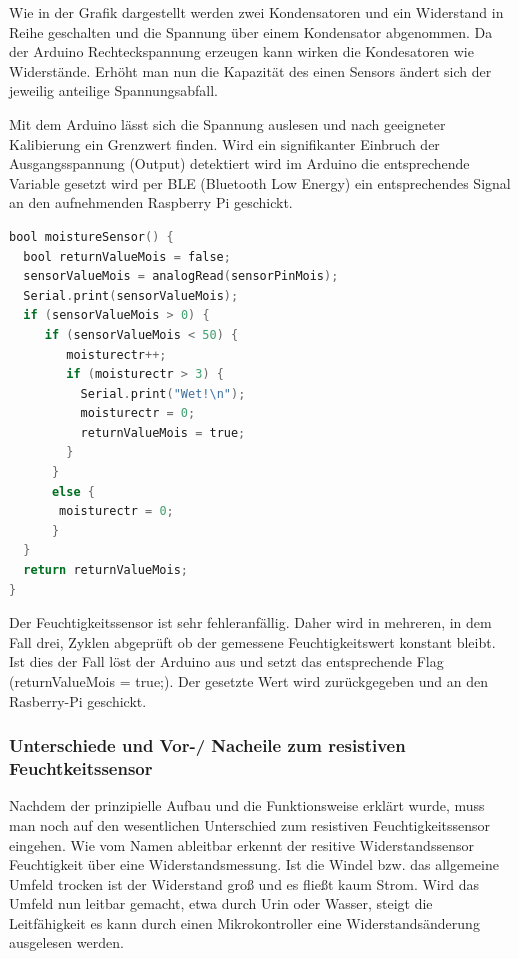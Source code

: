 Wie in der Grafik dargestellt werden zwei Kondensatoren und ein Widerstand in Reihe geschalten und die Spannung über einem Kondensator abgenommen. Da der Arduino Rechteckspannung erzeugen kann wirken die Kondesatoren wie Widerstände. Erhöht man nun die Kapazität des einen Sensors ändert sich der jeweilig anteilige Spannungsabfall.

Mit dem Arduino lässt sich die Spannung auslesen und nach geeigneter Kalibierung ein Grenzwert finden. Wird ein signifikanter Einbruch der Ausgangsspannung (Output) detektiert wird im Arduino die entsprechende Variable gesetzt wird per BLE (Bluetooth Low Energy) ein entsprechendes Signal an den aufnehmenden Raspberry Pi geschickt.
\pagebreak

\begin{lstlisting}[language=C, caption=Feuchtigkeitsdetektion im Arduino]
bool moistureSensor() {
  bool returnValueMois = false;
  sensorValueMois = analogRead(sensorPinMois);
  Serial.print(sensorValueMois);
  if (sensorValueMois > 0) {
     if (sensorValueMois < 50) {
        moisturectr++;
        if (moisturectr > 3) {
          Serial.print("Wet!\n");
          moisturectr = 0;
          returnValueMois = true;
        }
      }
      else {
       moisturectr = 0;
      }
  }
  return returnValueMois;
}
\end{lstlisting}

Der Feuchtigkeitssensor ist sehr fehleranfällig. Daher wird in mehreren, in dem Fall drei, Zyklen abgeprüft ob der gemessene Feuchtigkeitswert konstant bleibt. Ist dies der Fall löst der Arduino aus und setzt das entsprechende Flag (\glqq{}returnValueMois = true;\grqq{}). Der gesetzte Wert wird zurückgegeben und an den Rasberry-Pi geschickt. 
 
\subsubsection{Unterschiede und Vor-/ Nacheile zum resistiven Feuchtkeitssensor}
Nachdem der prinzipielle Aufbau und die Funktionsweise erklärt wurde, muss man noch auf den wesentlichen Unterschied zum resistiven Feuchtigkeitssensor eingehen. Wie vom Namen ableitbar erkennt der resitive Widerstandssensor Feuchtigkeit über eine Widerstandsmessung. Ist die Windel bzw. das allgemeine Umfeld trocken ist der Widerstand groß und es fließt kaum Strom. Wird das Umfeld nun leitbar gemacht, etwa durch Urin oder Wasser, steigt die Leitfähigkeit es kann durch einen Mikrokontroller eine Widerstandsänderung ausgelesen werden. 


